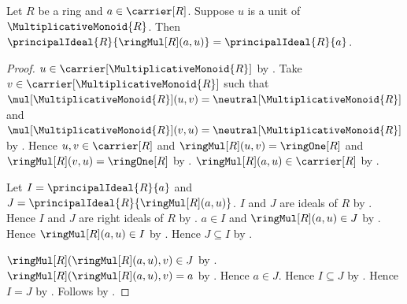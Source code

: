 \begin{theorem}\label{principal_ideal_mul_unit_right}
    Let $R$ be a ring and $a\in\carrier[R]$.
    Suppose $u$ is a unit of $\MultiplicativeMonoid{R}$.
    Then
        $\principalIdeal{R}{\ringMul[R](a,u)}
            =\principalIdeal{R}{a}$.
\end{theorem}
\begin{proof}
    $u\in\carrier[\MultiplicativeMonoid{R}]$ by
        .
    Take $v\in\carrier[\MultiplicativeMonoid{R}]$ such that
        $\mul[\MultiplicativeMonoid{R}](u,v)
            =\neutral[\MultiplicativeMonoid{R}]$ and
        $\mul[\MultiplicativeMonoid{R}](v,u)
            =\neutral[\MultiplicativeMonoid{R}]$ by
        .
    Hence $u,v\in\carrier[R]$ and
        $\ringMul[R](u,v)=\ringOne[R]$ and
        $\ringMul[R](v,u)=\ringOne[R]$ by
        .
    $\ringMul[R](a,u)\in\carrier[R]$ by .

    Let $I=\principalIdeal{R}{a}$ and
        $J=\principalIdeal{R}{\ringMul[R](a,u)}$.
    $I$ and $J$ are ideals of $R$ by
        .
    Hence $I$ and $J$ are right ideals of $R$ by
        .
    $a\in I$ and $\ringMul[R](a,u)\in J$ by
        .
    Hence $\ringMul[R](a,u)\in I$ by
        .
    Hence $J\subseteq I$ by
        .

    $\ringMul[R](\ringMul[R](a,u),v)\in J$ by
        .
    $\ringMul[R](\ringMul[R](a,u),v)=a$ by
        .
    Hence $a\in J$.
    Hence $I\subseteq J$ by
        .
    Hence $I=J$ by .
    Follows by \auto.
\end{proof}

